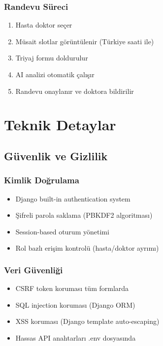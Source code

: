 \documentclass[12pt,a4paper]{article}
\begin{document}
\subsubsection{Randevu Süreci}
\begin{enumerate}
    \item Hasta doktor seçer
    \item Müsait slotlar görüntülenir (Türkiye saati ile)
    \item Triyaj formu doldurulur
    \item AI analizi otomatik çalışır
    \item Randevu onaylanır ve doktora bildirilir
\end{enumerate}

\section{Teknik Detaylar}

\subsection{Güvenlik ve Gizlilik}

\subsubsection{Kimlik Doğrulama}
\begin{itemize}
    \item Django built-in authentication system
    \item Şifreli parola saklama (PBKDF2 algoritması)
    \item Session-based oturum yönetimi
    \item Rol bazlı erişim kontrolü (hasta/doktor ayrımı)
\end{itemize}

\subsubsection{Veri Güvenliği}
\begin{itemize}
    \item CSRF token koruması tüm formlarda
    \item SQL injection koruması (Django ORM)
    \item XSS koruması (Django template auto-escaping)
    \item Hassas API anahtarları .env dosyasında
\end{itemize}
\end{document}
